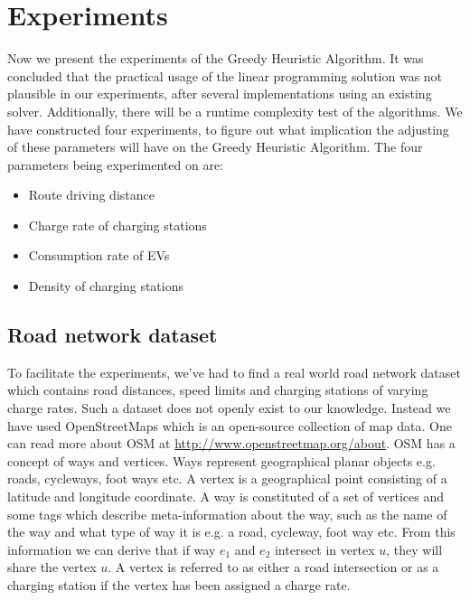 \section{Experiments}
\label{sec:experiments}
Now we present the experiments of the Greedy Heuristic Algorithm. It was concluded that the practical usage of the linear programming solution was not plausible in our experiments, after several implementations using an existing solver. Additionally, there will be a runtime complexity test of the algorithms. We have constructed four experiments, to figure out what implication the adjusting of these parameters will have on the Greedy Heuristic Algorithm. The four parameters being experimented on are:

\begin{itemize}
     \item Route driving distance
     \item Charge rate of charging stations
     \item Consumption rate of EVs
     \item Density of charging stations
 \end{itemize} 



\subsection{Road network dataset} 
\label{sub:setup}
To facilitate the experiments, we've had to find a real world road network dataset which contains road distances, speed limits and charging stations of varying charge rates. Such a dataset does not openly exist to our knowledge. Instead we have used OpenStreetMaps which is an open-source collection of map data. One can read more about OSM at \url{http://www.openstreetmap.org/about}. OSM has a concept of ways and vertices. Ways represent geographical planar objects e.g. roads, cycleways, foot ways etc. A vertex is a geographical point consisting of a latitude and longitude coordinate. A way is constituted of a set of vertices and some tags which describe meta-information about the way, such as the name of the way and what type of way it is e.g. a road, cycleway, foot way  etc. From this information we can derive that if way $e_1$ and $e_2$ intersect in vertex $u$, they will share the vertex $u$. A vertex is referred to as either a road intersection or as a charging station if the vertex has been assigned a charge rate.

